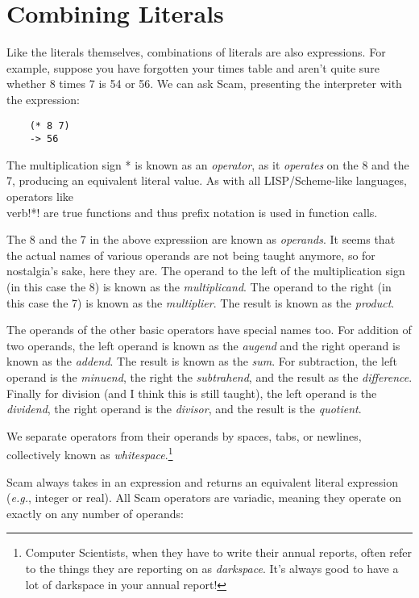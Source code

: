 \chapter{Combining Literals}
\label{CombiningLiterals}

Like the literals themselves, combinations of literals are also
expressions. For example, suppose you have forgotten your times table
and aren't quite sure whether 8 times 7 is 54 or 56. We can ask Scam,
presenting the interpreter with the expression:

\begin{verbatim}
    (* 8 7)
    -> 56
\end{verbatim}

The
multiplication sign * is known as an {\it operator}, as it {\it operates} on the 8
and the 7, producing an equivalent literal value.
As with all LISP/Scheme-like languages, operators like \\verb!*!
are true functions and thus prefix notation is used in function calls.

The 8 and the 7 in the above expressiion are
known as {\it operands}. It seems that the actual names of various operands are
not being taught anymore, so for nostalgia's sake, here they are. The
operand to the left of the multiplication sign (in this case the 8) is
known as the {\it multiplicand}. The operand to the right (in this case the 7)
is known as the {\it multiplier}. The result is known as the {\it product}.

The operands of the other basic operators
have special names too. For addition of two operands, the left operand is known as the
{\it augend} and the right operand is known as the {\it addend}.
The result is known as the {\it sum}.
For subtraction,
the left operand is the {\it minuend}, the right the {\it subtrahend}, and
the result as the {\it difference}.
Finally
for division (and I think this is still taught), the left operand is
the {\it dividend}, the right operand is the {\it divisor}, and the 
result is the {\it quotient}.

We separate
operators from their operands by
spaces, tabs,
or newlines, collectively known as {\it whitespace}.\footnote{
Computer Scientists, when they have to write their annual reports,
often refer to the things they are reporting on as
{\it darkspace}. It's always good to have a lot of darkspace in
your annual report!
}

Scam always takes in an expression and returns an equivalent
literal expression ({\it e.g.}, integer or real). All Scam operators are
variadic, meaning they operate on exactly on any number of operands:


